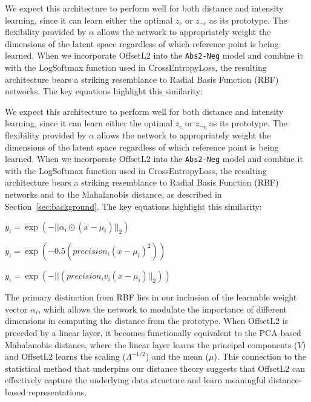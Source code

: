 We expect this architecture to perform well for both distance and intensity learning, since it can learn either the optimal $z_c$ or $z_{\neg c}$ as its prototype. The flexibility provided by $\alpha$ allows the network to appropriately weight the dimensions of the latent space regardless of which reference point is being learned. When we incorporate OffsetL2 into the \texttt{Abs2-Neg} model and combine it with the LogSoftmax function used in CrossEntropyLoss, the resulting architecture bears a striking resemblance to Radial Basis Function (RBF) networks. The key equations highlight this similarity: 

We expect this architecture to perform well for both distance and intensity learning, since it can learn either the optimal $z_c$ or $z_{\neg c}$ as its prototype. The flexibility provided by $\alpha$ allows the network to appropriately weight the dimensions of the latent space regardless of which reference point is being learned. When we incorporate OffsetL2 into the \texttt{Abs2-Neg} model and combine it with the LogSoftmax function used in CrossEntropyLoss, the resulting architecture bears a striking resemblance to Radial Basis Function (RBF) networks and to the Mahalanobis distance, as described in Section~\ref{sec:background}. The key equations highlight this similarity:


    $y_i = \exp(- || \alpha_i \odot (x - \mu_i) ||_2 )$

    
    $y_i = \exp( -0.5(precision_i (x - \mu_i)^2) )$

    
    $y_i = \exp( -||(precision_i v_i (x - \mu_i)||_2) )$


The primary distinction from RBF lies in our inclusion of the learnable weight vector $\alpha_i$, which allows the network to modulate the importance of different dimensions in computing the distance from the prototype.  When OffsetL2 is preceded by a linear layer, it becomes functionally equivalent to the PCA-based Mahalanobis distance, where the linear layer learns the principal components ($V$) and OffsetL2 learns the scaling ($\Lambda^{-1/2}$) and the mean ($\mu$). This connection to the statistical method that underpins our distance theory suggests that OffsetL2 can effectively capture the underlying data structure and learn meaningful distance-based representations.

